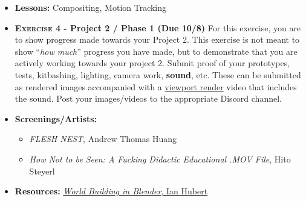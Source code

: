 \def\dMon{3/1}%
\def\dTues{3/2}%
\def\dWed{3/3}%
\def\dThur{3/4}%
\placeDate

\def\tues{10/6}%
\def\thur{10/8}%
% 
\begin{itemize}[noitemsep,topsep=0pt,leftmargin=*]
    \item \textbf{Lessons:} Compositing, Motion Tracking
    \item \textbf{\textsc{Exercise 4} - Project 2 / Phase 1 (Due \thur)} For this exercise, you are to show progress made towards your Project 2. This exercise is not meant to show ``\emph{how much}'' progress you have made, but to demonstrate that you are actively working towards your project 2. Submit proof of your prototypes, tests, kitbashing, lighting, camera work, \textbf{sound}, etc. These can be submitted as rendered images accompanied with a \href{https://docs.blender.org/manual/en/latest/editors/3dview/viewport_render.html}{viewport render} video that includes the sound. Post your images/videos to the appropriate Discord channel.
    \item \textbf{Screenings/Artists:}
          \begin{itemize}
              \item \emph{FLESH NEST}, Andrew Thomas Huang
              \item \emph{How Not to be Seen: A Fucking Didactic Educational .MOV File}, Hito Steyerl
          \end{itemize}
    \item \textbf{Resources:} \href{https://www.youtube.com/watch?v=whPWKecazgM}{\emph{World Building in Blender}, Ian Hubert}
\end{itemize}